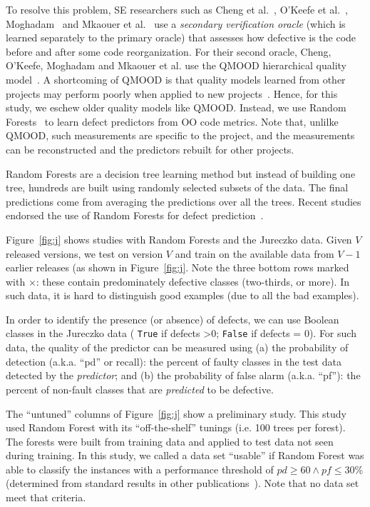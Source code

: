 \documentclass[twocolumn,5p]{elsarticle}
\newcommand{\fig}[1]{Figure~\ref{fig:#1}}
\theoremstyle{break}
\begin{document}
\begin{itemize}
		To resolve this  problem, SE researchers such as 
		Cheng et al.~\cite{Cheng10}, O'Keefe et al.~\cite{OKeeffe08,OKeeffe07},
		Moghadam~\cite{Moghadam2011} and Mkaouer et al.~\cite{Mkaouer14}
		use a {\em secondary verification oracle} (which is learned separately
		to the primary oracle) that   assesses
		how defective is the code before and after some
		code reorganization. 
		For their second oracle,
		Cheng, O'Keefe, Moghadam and  Mkaouer et al. use the QMOOD hierarchical
		quality model~\cite{Bansiya02}.
		A shortcoming of QMOOD
		is that quality models learned from other projects
		may perform poorly when applied to new projects~\cite{localvsglobal}.
		Hence, for this study, we  eschew
		older quality models like QMOOD. Instead, we use
		Random Forests~\cite{Breiman2001} to learn defect predictors
		from OO code metrics.
		Note that, unlilke QMOOD, such measurements 
		are specific to the project, and the measurements can be reconstructed and the predictors rebuilt for other projects.
		
		Random Forests are a decision tree learning method but
		instead of building one tree, hundreds are built using
		randomly selected subsets of the data. The final predictions
		come from averaging the predictions over all the trees.
		Recent studies endorsed the use
		of  Random Forests for  defect prediction~\cite{lessmann}.
		
		\fig{j} shows   studies with Random Forests and
		the Jureczko data. Given   $V$ released versions, we test on version $V$ and train on the available data from $V-1$ earlier releases (as shown in \fig{j}. Note the   \colorbox{lavenderpink}{three bottom rows}   marked with $\times$: these contain predominately defective classes (two-thirds, or more).  In such data, it is hard to distinguish good examples (due to all the bad examples). 
		
		In order to identify the presence (or absence) of defects, we can   use Boolean classes in the  Jureczko data ( \texttt{True} if defects \textgreater 0; \texttt{False} if defects = 0). For such data, the quality of the predictor can be measured using (a) the  probability of detection (a.k.a. ``pd'' or recall):  the percent of faulty classes in the test data detected by the {\em predictor}; and (b) the  probability of false alarm (a.k.a. ``pf''): the percent of non-fault classes that are {\em predicted} to be defective.
		
		The ``untuned'' columns of \fig{j}
		show a preliminary study. This study used
		Random Forest with its ``off-the-shelf'' tunings (i.e.  
		100 trees per forest).  
		The forests were built from training data and applied to test data
		not seen during training.  In this
		study, we called a data set ``usable'' if   Random Forest was able to classify the instances with a performance threshold of $\mathit{pd}\ge 60 \wedge \mathit{pf} \le 30$\% (determined from standard results in other publications~\cite{me07b}). Note that no  data set meet
		that criteria.
		

\end{itemize}
\end{document}
